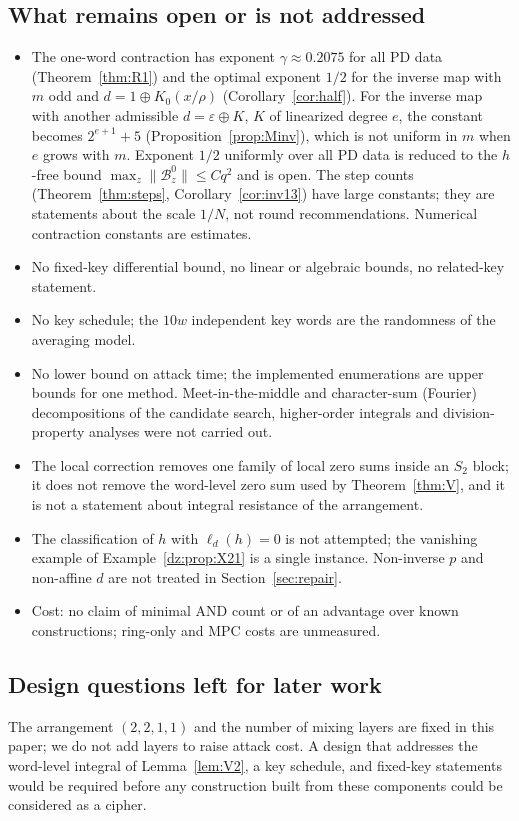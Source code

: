 \subsection{What remains open or is not addressed}
\begin{itemize}
\item The one-word contraction has exponent $\gamma\approx0.2075$ for all PD data (Theorem~\ref{thm:R1}) and the optimal exponent
$1/2$ for the inverse map with $m$ odd and $d=1\oplus K_0(x/\rho)$ (Corollary~\ref{cor:half}). For the inverse map with another admissible
$d=\varepsilon\oplus K$, $K$ of linearized degree $e$, the constant becomes $2^{e+1}+5$ (Proposition~\ref{prop:Minv}), which is not uniform in $m$ when $e$
grows with $m$. Exponent $1/2$ uniformly over all PD data is reduced to the
$h$-free bound $\max_z\|\mathcal B^0_z\|\le Cq^2$ and is open. The step counts (Theorem~\ref{thm:steps}, Corollary~\ref{cor:inv13}) have
large constants; they are statements about the scale $1/N$, not round recommendations. Numerical contraction constants are estimates.
\item No fixed-key differential bound, no linear or algebraic bounds, no related-key statement.
\item No key schedule; the $10w$ independent key words are the randomness of the averaging model.
\item No lower bound on attack time; the implemented enumerations are upper bounds for one method.
Meet-in-the-middle and character-sum (Fourier) decompositions of the candidate search, higher-order
integrals and division-property analyses were not carried out.
\item The local correction removes one family of local zero sums inside an $S_2$ block; it does not remove
the word-level zero sum used by Theorem~\ref{thm:V}, and it is not a statement about integral resistance of
the arrangement.
\item The classification of $h$ with $\ell_d(h)=0$ is not attempted; the vanishing example of
Example~\ref{dz:prop:X21} is a single instance. Non-inverse $p$ and non-affine $d$ are not treated in
Section~\ref{sec:repair}.
\item Cost: no claim of minimal AND count or of an advantage over known constructions; ring-only and MPC
costs are unmeasured.
\end{itemize}

\subsection{Design questions left for later work}
The arrangement $(2,2,1,1)$ and the number of mixing layers are fixed in this paper; we do not add layers
to raise attack cost. A design that addresses the word-level integral of Lemma~\ref{lem:V2}, a key
schedule, and fixed-key statements would be required before any construction built from these
components could be considered as a cipher.

